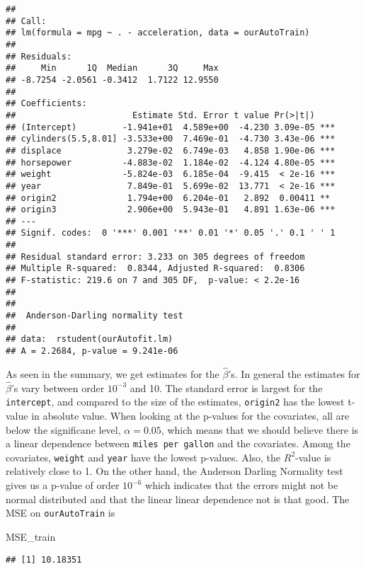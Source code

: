 \documentclass[]{article}
\newenvironment{Shaded}{\begin{snugshade}}{\end{snugshade}}
\newcommand{\NormalTok}[1]{#1}
\begin{document}
\begin{verbatim}
## 
## Call:
## lm(formula = mpg ~ . - acceleration, data = ourAutoTrain)
## 
## Residuals:
##     Min      1Q  Median      3Q     Max 
## -8.7254 -2.0561 -0.3412  1.7122 12.9550 
## 
## Coefficients:
##                       Estimate Std. Error t value Pr(>|t|)    
## (Intercept)         -1.941e+01  4.589e+00  -4.230 3.09e-05 ***
## cylinders(5.5,8.01] -3.533e+00  7.469e-01  -4.730 3.43e-06 ***
## displace             3.279e-02  6.749e-03   4.858 1.90e-06 ***
## horsepower          -4.883e-02  1.184e-02  -4.124 4.80e-05 ***
## weight              -5.824e-03  6.185e-04  -9.415  < 2e-16 ***
## year                 7.849e-01  5.699e-02  13.771  < 2e-16 ***
## origin2              1.794e+00  6.204e-01   2.892  0.00411 ** 
## origin3              2.906e+00  5.943e-01   4.891 1.63e-06 ***
## ---
## Signif. codes:  0 '***' 0.001 '**' 0.01 '*' 0.05 '.' 0.1 ' ' 1
## 
## Residual standard error: 3.233 on 305 degrees of freedom
## Multiple R-squared:  0.8344, Adjusted R-squared:  0.8306 
## F-statistic: 219.6 on 7 and 305 DF,  p-value: < 2.2e-16
## 
## 
##  Anderson-Darling normality test
## 
## data:  rstudent(ourAutofit.lm)
## A = 2.2684, p-value = 9.241e-06
\end{verbatim}

As seen in the summary, we get estimates for the \(\hat\beta\)'s. In
general the estimates for \(\hat\beta\)'s vary between order \(10^{-3}\)
and 10. The standard error is largest for the \texttt{intercept}, and
compared to the size of the estimates, \texttt{origin2} has the lowest
t-value in absolute value. When looking at the p-values for the
covariates, all are below the significane level, \(\alpha=0.05\), which
means that we should believe there is a linear dependence between
\texttt{miles\ per\ gallon} and the covariates. Among the covariates,
\texttt{weight} and \texttt{year} have the lowest p-values. Also, the
\(R^2\)-value is relatively close to 1. On the other hand, the Anderson
Darling Normality test gives us a p-value of order \(10^{-6}\) which
indicates that the errors might not be normal distributed and that the
linear linear dependence not is that good. The MSE on
\texttt{ourAutoTrain} is

\begin{Shaded}
\begin{Highlighting}[]
\NormalTok{MSE_train}
\end{Highlighting}
\end{Shaded}

\begin{verbatim}
## [1] 10.18351
\end{verbatim}
\end{document}
